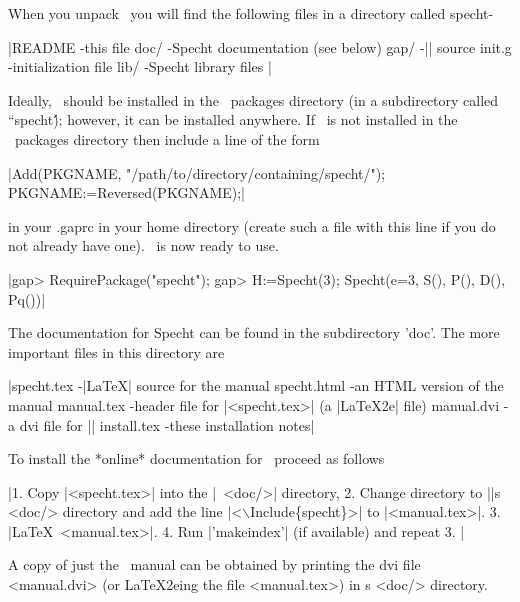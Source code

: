 
When you unpack \Specht\ you will find the following files in a 
directory called specht-\VersionNo\:

|README       -this file
doc/         -Specht documentation (see below)
gap/         -|\GAP| source
init.g       -initialization file
lib/         -Specht library files |

Ideally, \Specht\ should be installed in the \GAP\ packages directory (in 
a subdirectory called ``specht\'\'); however, it can be installed anywhere. 
If \Specht\ is not installed in the \GAP\ packages directory then include a
line of the form

|Add(PKGNAME, "/path/to/directory/containing/specht/"); 
PKGNAME:=Reversed(PKGNAME);|

in your .gaprc in your home directory (create such a file with this line if
you do not already have one). \Specht\ is now ready to use.

|gap> RequirePackage("specht");
gap> H:=Specht(3);
Specht(e=3, S(), P(), D(), Pq())|



The documentation for Specht can be found in the subdirectory 'doc'. The
more important files in this directory are\:

|specht.tex  -|\LaTeX| source for the manual
specht.html -an HTML version of the manual
manual.tex  -header file for |<specht.tex>| (a |\LaTeX2e| file) 
manual.dvi  -a dvi file for |\Specht|
install.tex -these installation notes|

To install the *online* documentation for \Specht\ proceed as 
follows\:

|1. Copy |<specht.tex>| into the |\GAP\ <doc/>| directory, 
2. Change directory to |\GAP|s <doc/> directory and add the line 
   |<$\backslash$Include\{specht\}>| to |<manual.tex>|.
3. |\LaTeX\ <manual.tex>|.
4. Run |'makeindex'| (if available) and repeat 3. |

A copy of just the \Specht\ manual can be obtained by printing the dvi file
<manual.dvi> (or \LaTeX2eing the file <manual.tex>) in \Specht s <doc/> 
directory.

\endinput
